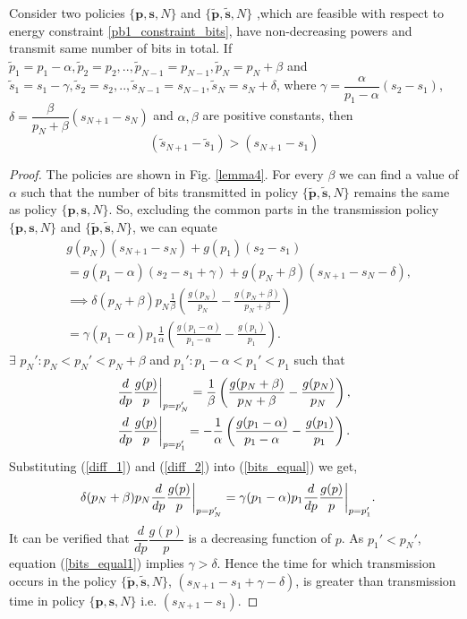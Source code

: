\begin{lemma}
Consider two policies $\{\textbf{p},\textbf{s},N\}$  and $\{\bm{\widetilde{p}},\bm{\widetilde{s}},N\}$ ,which are feasible with respect to energy constraint \eqref{pb1_constraint_bits}, have non-decreasing powers and transmit same number of bits in total. If $\widetilde{p}_1=p_1-\alpha,\widetilde{p}_2=p_2,..,\widetilde{p}_{N-1}=p_{N-1},\widetilde{p}_N=p_N+\beta $ and $\widetilde{s}_1=s_1-\gamma,\widetilde{s}_2=s_2,..,\widetilde{s}_{N-1}=s_{N-1},\widetilde{s}_N=s_N+\delta $, where $\gamma=\dfrac{\alpha}{p_1-\alpha}(s_2-s_1)$, $\delta =\dfrac{\beta}{p_N+\beta}(s_{N+1}-s_N)$ and $\alpha ,\beta$ are positive constants, then 
\begin{equation}
(\widetilde{s}_{N+1}-\widetilde{s}_1)>(s_{N+1}-s_1)
\end{equation}
\label{lemma_increase_time}
\end{lemma}
\begin{proof}
The policies are shown in Fig. \ref{lemma4}. For every $\beta$ we can find a value of $\alpha$ such that the number of bits transmitted in policy $\{\bm{\widetilde{p}},\bm{\widetilde{s}},N\}$ remains the same as policy $\{\textbf{p},\textbf{s},N\}$. So, excluding the common parts in the transmission policy $\{\textbf{p},\textbf{s},N\}$ and $\{\bm{\widetilde{p}},\bm{\widetilde{s}},N\}$, we can equate
\begin{align}
&g(p_N)(s_{N+1}-s_N)+g(p_1)(s_2-s_1)\nonumber
\\
&=g(p_1-\alpha)(s_2-s_1+\gamma)+g(p_N+\beta)(s_{N+1}-s_N-\delta)\nonumber,
\\
&\implies \delta(p_N+\beta)p_N\frac{1}{\beta}\left(\frac{g(p_N)}{p_N}-\frac{g(p_N+\beta)}{p_N+\beta}\right)\nonumber
\\
&=\gamma(p_1-\alpha)p_1\frac{1}{\alpha}\left(\frac{g(p_1-\alpha)}{p_1-\alpha}-\frac{g(p_1)}{p_1}\right).\label{bits_equal}
\end{align}
$\exists$ $p_N':p_N<p_N'<p_{N}+\beta$ and $p_1':p_1-\alpha<p_1'<p_{1}$ such that
\begin{align}
&\frac{d}{dp} \frac{g(p)}{p} \bigg{\vert}_{p=p_N'}=\frac{1}{\beta}\left(\frac{g(p_N+\beta)}{p_N+\beta}-\frac{g(p_N)}{p_N}\right),\label{diff_1}
\\
&\frac{d}{dp} \frac{g(p)}{p}\bigg{\vert}_{p=p_1'}=-\frac{1}{\alpha}\left(\frac{g(p_1-\alpha)}{p_1-\alpha}-\frac{g(p_1)}{p_1}\right)\label{diff_2}.
\end{align}
Substituting (\ref{diff_1}) and (\ref{diff_2}) into (\ref{bits_equal}) we get,
\begin{align}
&\delta(p_N+\beta)p_N\frac{d}{dp} \frac{g(p)}{p}  \bigg{\vert}_{p=p_N'}
=\gamma(p_1-\alpha)p_1\frac{d}{dp} \frac{g(p)}{p} \bigg{\vert}_{p=p_1'}.\label{bits_equal1}
\end{align}
It can be verified that $\dfrac{d}{dp} \dfrac{g(p)}{p}$ is a decreasing function of $p$. As $p_1'<p_N'$, equation (\ref{bits_equal1}) implies $\gamma >\delta$. Hence the time for which transmission occurs in the policy $\{\bm{\widetilde{p}},\bm{\widetilde{s}},N\}$, $\left( s_{N+1}-s_1+\gamma-\delta\right)$, is greater than transmission time in policy $\{\textbf{p},\textbf{s},N\}$ i.e. $(s_{N+1}-s_1)$.
\end{proof}